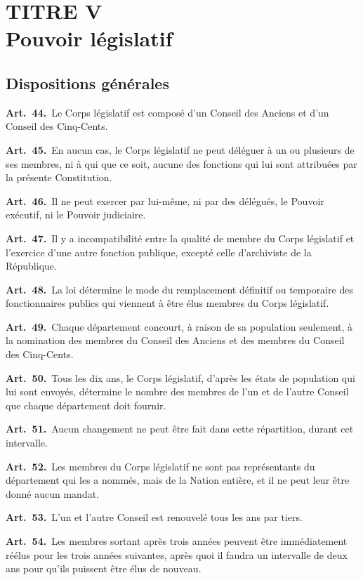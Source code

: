 \documentclass[french,twoside]{book} %
\newcommand{\labelchar}[1]{\textbf{\color{rubric} #1}}
\begin{document}
\section[{TITRE V. Pouvoir législatif}]{TITRE V \\
Pouvoir législatif}


\subsection[{Dispositions générales}]{Dispositions générales}

\labelchar{Art. 44.} Le Corps législatif est composé d’un Conseil des Anciens et d’un Conseil des Cinq-Cents.\par
\labelchar{Art. 45.} En aucun cas, le Corps législatif ne peut déléguer à un ou plusieurs de ses membres, ni à qui que ce soit, aucune des fonctions qui lui sont attribuées par la présente Constitution.\par
\labelchar{Art. 46.} Il ne peut exercer par lui-même, ni par des délégués, le Pouvoir exécutif, ni le Pouvoir judiciaire.\par
\labelchar{Art. 47.} Il y a incompatibilité entre la qualité de membre du Corps législatif et l’exercice d’une autre fonction publique, excepté celle d’archiviste de la République.\par
\labelchar{Art. 48.} La loi détermine le mode du remplacement définitif ou temporaire des fonctionnaires publics qui viennent à être élus membres du Corps législatif.\par
\labelchar{Art. 49.} Chaque département concourt, à raison de sa population seulement, à la nomination des membres du Conseil des Anciens et des membres du Conseil des Cinq-Cents.\par
\labelchar{Art. 50.} Tous les dix ans, le Corps législatif, d’après les états de population qui lui sont envoyés, détermine le nombre des membres de l’un et de l’autre Conseil que chaque département doit fournir.\par
\labelchar{Art. 51.} Aucun changement ne peut être fait dans cette répartition, durant cet intervalle.\par
\labelchar{Art. 52.} Les membres du Corps législatif ne sont pas représentants du département qui les a nommés, mais de la Nation entière, et il ne peut leur être donné aucun mandat.\par
\labelchar{Art. 53.} L’un et l’autre Conseil est renouvelé tous les ans par tiers.\par
\labelchar{Art. 54.} Les membres sortant après trois années peuvent être immédiatement réélus pour les trois années suivantes, après quoi il faudra un intervalle de deux ans pour qu’ils puissent être élus de nouveau.\par
\end{document}
